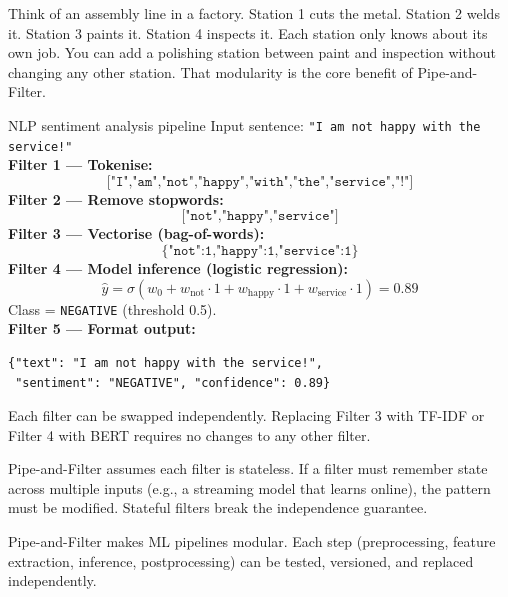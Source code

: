 \documentclass[a4paper,11pt]{article}
\begin{document}
\begin{intuition}
Think of an assembly line in a factory. Station 1 cuts the metal. Station 2 welds it. Station 3 paints it. Station 4 inspects it. Each station only knows about its own job. You can add a polishing station between paint and inspection without changing any other station. That modularity is the core benefit of Pipe-and-Filter.
\end{intuition}

\begin{worked}{NLP sentiment analysis pipeline}
Input sentence: \texttt{"I am not happy with the service!"} \\[4pt]
\textbf{Filter 1 --- Tokenise:}
\[\texttt{["I","am","not","happy","with","the","service","!"]}\]
\textbf{Filter 2 --- Remove stopwords:}
\[\texttt{["not","happy","service"]}\]
\textbf{Filter 3 --- Vectorise (bag-of-words):}
\[\texttt{\{"not":1,"happy":1,"service":1\}}\]
\textbf{Filter 4 --- Model inference (logistic regression):}
\[\hat{y} = \sigma(w_0 + w_{\text{not}} \cdot 1 + w_{\text{happy}} \cdot 1 + w_{\text{service}} \cdot 1) = 0.89\]
Class = \texttt{NEGATIVE} (threshold 0.5). \\[4pt]
\textbf{Filter 5 --- Format output:}
\begin{verbatim}
{"text": "I am not happy with the service!",
 "sentiment": "NEGATIVE", "confidence": 0.89}
\end{verbatim}
Each filter can be swapped independently. Replacing Filter 3 with TF-IDF or Filter 4 with BERT requires no changes to any other filter.
\end{worked}

\begin{watchout}
Pipe-and-Filter assumes each filter is stateless. If a filter must remember state across multiple inputs (e.g., a streaming model that learns online), the pattern must be modified. Stateful filters break the independence guarantee.
\end{watchout}

\begin{keytake}
Pipe-and-Filter makes ML pipelines modular. Each step (preprocessing, feature extraction, inference, postprocessing) can be tested, versioned, and replaced independently.
\end{keytake}
\end{document}
